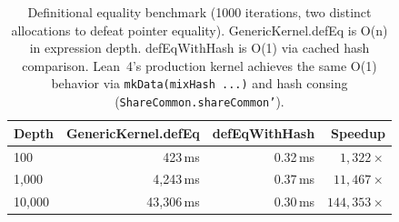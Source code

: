 \begin{table}[H]
\centering
\begin{tabular}{@{}lrrr@{}}
\toprule
Depth & GenericKernel.defEq & defEqWithHash & Speedup \\
\midrule
100 & 423\,ms & 0.32\,ms & $1{,}322\times$ \\
1{,}000 & 4{,}243\,ms & 0.37\,ms & $11{,}467\times$ \\
10{,}000 & 43{,}306\,ms & 0.30\,ms & $144{,}353\times$ \\
\bottomrule
\end{tabular}
\caption{Definitional equality benchmark (1000 iterations, two distinct allocations to defeat pointer equality).  GenericKernel.defEq is O(n) in expression depth.  defEqWithHash is O(1) via cached hash comparison.  Lean~4's production kernel achieves the same O(1) behavior via \texttt{mkData(mixHash ...)} and hash consing (\texttt{ShareCommon.shareCommon'}).}
\label{tab:benchmark}
\end{table}
